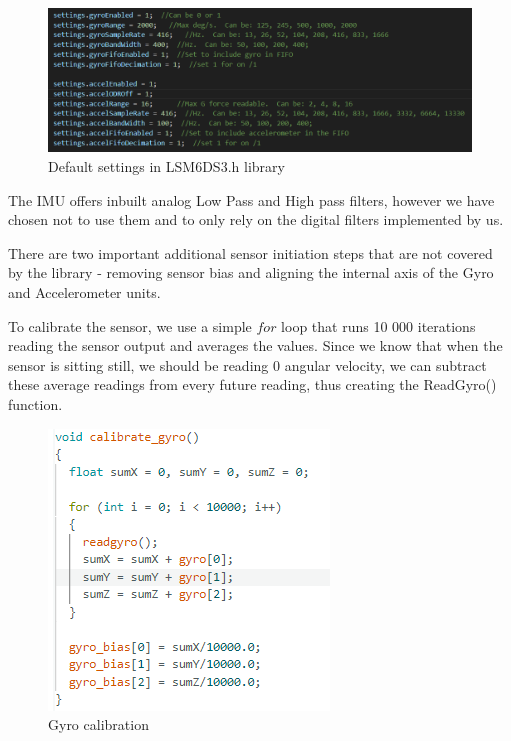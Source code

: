 \begin{figure}[H]
    \begin{center}
    \includegraphics[scale = 0.55]{pictures/IMU/Library_settings.png}
    \end{center}
    \caption{Default settings in LSM6DS3.h library}
    \label{fig:my_label}
\end{figure}


The IMU offers inbuilt analog Low Pass and High pass filters, however we have chosen not to use them and to only rely on the digital filters implemented by us.

There are two important additional sensor initiation steps that are not covered by the library - removing sensor bias and aligning the internal axis of the Gyro and Accelerometer units. 

To calibrate the sensor, we use a simple $for$ loop that runs 10 000 iterations reading the sensor output and averages the values. Since we know that when the sensor is sitting still, we should be reading 0 angular velocity, we can subtract these average readings from every future reading, thus creating the ReadGyro() function. 


\begin{figure}[H]
    \begin{center}
    \includegraphics[scale = 0.85]{pictures/IMU/gyro_calibrate.png}
    \end{center}
    \caption{Gyro calibration}
    \label{fig:my_label}
\end{figure}

